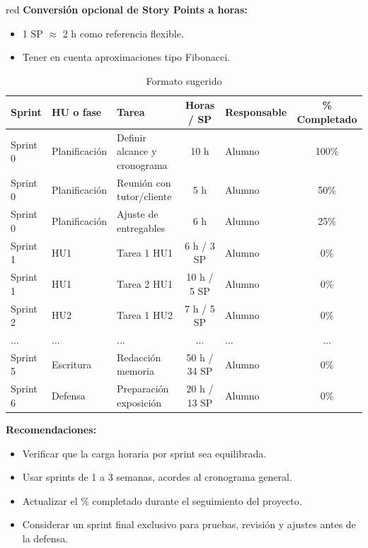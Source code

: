 \documentclass[
11pt, %
]{charter}
\begin{document}
\begin{consigna}{red}
\textbf{Conversión opcional de Story Points a horas:}
\begin{itemize}
  \item 1 SP \(\approx\) 2 h como referencia flexible.
  \item Tener en cuenta aproximaciones tipo Fibonacci.
\end{itemize}

\begin{table}[htpb]
\centering
\caption{Formato sugerido}
\begin{tabularx}{\linewidth}{@{}|l|l|X|c|l|c|@{}}
\hline
\rowcolor[HTML]{C0C0C0}
Sprint & HU o fase & Tarea & Horas / SP & Responsable & \% Completado \\ \hline
Sprint 0 & Planificación & Definir alcance y cronograma & 10 h & Alumno & 100\% \\ \hline
Sprint 0 & Planificación & Reunión con tutor/cliente & 5 h & Alumno & 50\% \\ \hline
Sprint 0 & Planificación & Ajuste de entregables & 6 h & Alumno & 25\% \\ \hline
Sprint 1 & HU1 & Tarea 1 HU1 & 6 h / 3 SP & Alumno & 0\% \\ \hline
Sprint 1 & HU1 & Tarea 2 HU1 & 10 h / 5 SP & Alumno & 0\% \\ \hline
Sprint 2 & HU2 & Tarea 1 HU2 & 7 h / 5 SP & Alumno & 0\% \\ \hline
... & ... & ... & ... & ... & ... \\ \hline
Sprint 5 & Escritura & Redacción memoria & 50 h / 34 SP & Alumno & 0\% \\ \hline
Sprint 6 & Defensa & Preparación exposición & 20 h / 13 SP & Alumno & 0\% \\ \hline
\end{tabularx}
\end{table}

\textbf{Recomendaciones:}
\begin{itemize}
  \item Verificar que la carga horaria por sprint sea equilibrada.
  \item Usar sprints de 1 a 3 semanas, acordes al cronograma general.
  \item Actualizar el \% completado durante el seguimiento del proyecto.
  \item Considerar un sprint final exclusivo para pruebas, revisión y ajustes antes de la defensa.
\end{itemize}

\end{consigna} %
\end{document}
